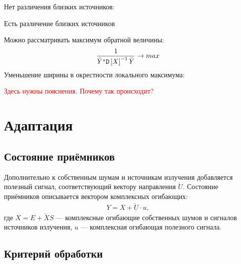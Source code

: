 Нет различения близких источников:

Есть различение близких источников

Можно рассматривать максимум обратной величины:
\[
    \frac{1}{\breve{Y}^* \mathtt{D} \left [ X \right ]^{-1} \breve{Y}} \rightarrow max
\]
Уменьшение ширины в окрестности локального максимума:

\textcolor{red}{Здесь нужны пояснения. Почему так происходит?}


\section{Адаптация}

\subsection{Состояние приёмников}

Дополнительно к собственным шумам и источникам излучения добавляется полезный сигнал, соответствующий вектору направления $\breve{U}$. Состояние приёмников описывается
вектором комплексных огибающих:
\begin{gather*}
    Y = X + \breve{U} \cdot u ,
\end{gather*}
где $X = E + \breve{X} S$ --- комплексные огибающие собственных шумов и сигналов источников излучения, $u$ --- комплексная огибающая полезного сигнала.

\subsection{Критерий обработки}

